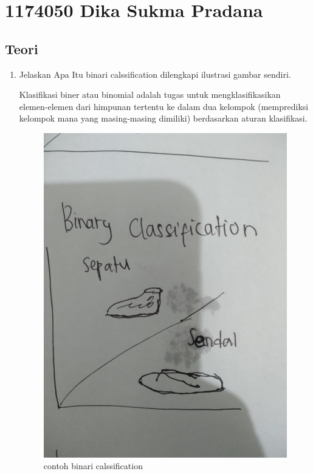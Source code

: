 \section{1174050 Dika Sukma Pradana}

\subsection{Teori}
\begin{enumerate}
\item Jelaskan Apa Itu binari calssification dilengkapi ilustrasi gambar sendiri.\par
Klasifikasi biner atau binomial adalah tugas untuk mengklasifikasikan elemen-elemen dari himpunan tertentu ke dalam dua kelompok (memprediksi kelompok mana yang masing-masing dimiliki) berdasarkan aturan klasifikasi.
\begin{figure}[ht]
\centering
\includegraphics[scale=0.01]{figures/1174050/chapter2/1.jpg}
\caption{contoh binari calssification}
\label{contoh}
\end{figure}



\end{enumerate}
